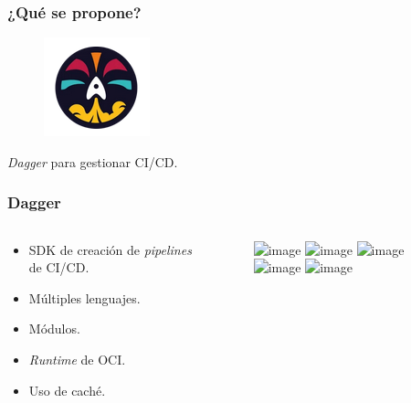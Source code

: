\documentclass{beamer}
\begin{document}
\begin{frame}
    \frametitle{¿Qué se propone?}
    \begin{figure}
        \includegraphics[scale=1.2]{figuras/Dagger_logo}
    \end{figure}
    \begin{center}
        {\it Dagger} para gestionar CI/CD.
    \end{center}
\end{frame}

\begin{frame}
    \frametitle{Dagger}
    \begin{columns}
        \begin{column}{0.45\textwidth}
            \begin{itemize}
                \item<1-> SDK de creación de \textit{pipelines} de CI/CD.
                \item<2-> Múltiples lenguajes.
                \item<3-> Módulos.
                \item<4-> {\it Runtime} de OCI.
                \item<5-> Uso de caché.
            \end{itemize}
        \end{column}
        \begin{column}{0.55\textwidth}
            \begin{figure}
                \includegraphics<1>[scale=0.2]{figuras/dagger}
                \includegraphics<2>[scale=0.25]{figuras/languages}
                \includegraphics<3>[scale=0.4]{figuras/daggerverse}
                \includegraphics<4>[scale=0.4]{figuras/docker}
                \includegraphics<5>[scale=0.1]{figuras/cache}
            \end{figure}
        \end{column}
    \end{columns}
\end{frame}
\end{document}
